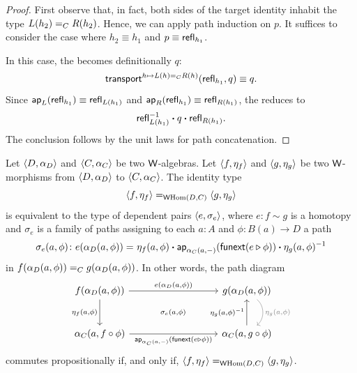 \begin{proof}
    First observe that, in fact, both sides of the target identity inhabit the type $L(h_2)\mathrel{=_{C}}R(h_2)$. Hence, we can apply path induction on $p$. It suffices to consider the case where $h_2\equiv h_1$ and $p\equiv\mathsf{refl}_{h_1}$. 
    
    In this case, the \lhs becomes definitionally $q$:
    \[
        \mathsf{transport}^{h \mapsto L(h) \mathrel{=_{C}} R(h)}(\mathsf{refl}_{h_1}, q) \equiv q.
    \]
    Since $\mathsf{ap}_L(\mathsf{refl}_{h_1})\equiv \mathsf{refl}_{L(h_1)}$ and $\mathsf{ap}_R(\mathsf{refl}_{h_1})\equiv \mathsf{refl}_{R(h_1)}$, the \rhs reduces to
    \[
        \mathsf{refl}_{L(h_1)}^{-1}
            \mathbin{\boldsymbol{\cdot}} q
            \mathbin{\boldsymbol{\cdot}}\mathsf{refl}_{R(h_1)}.
    \]
    The conclusion follows by the unit laws for path concatenation.
\end{proof}

\begin{lem}\label{lem:WHom-equality}
    Let\/ $\langle D,\alpha_D\rangle$ and\/ $\langle C,\alpha_C\rangle$ be two\/ $\mathsf{W}$-algebras. Let\/ $\langle f,\eta_f\rangle$ and\/ $\langle g,\eta_g\rangle$ be two\/ $\mathsf{W}$-morphisms from\/ $\langle D,\alpha_D\rangle$ to\/ $\langle C,\alpha_C\rangle$. The identity type
    \[
        \langle f,\eta_f\rangle\mathrel{=_{\mathsf{W}{\operatorname{Hom}}(D,C)}}\langle g,\eta_g\rangle
    \]
    is equivalent to the type of dependent pairs\/ $\langle e,\sigma_e\rangle$, where\/ $e\colon f\sim g$ is a homotopy and\/ $\sigma_e$ is a family of paths assigning to each\/ $a\colon A$ and\/ $\phi\colon B(a)\to D$ a path
    \[
        \sigma_e(a,\phi)\colon
            e(\alpha_D(a,\phi))
            \eq{}
            \eta_f(a,\phi)
            \ct\fun{ap}_{\alpha_C(a,\dummy)}(
                \fun{funext}(e\rwct\phi))
            \ct\eta_g(a,\phi)^{-1}
    \]
    in\/ $f(\alpha_D(a,\phi))\mathrel{=_{C}} g(\alpha_D(a,\phi))$. In other words, the path diagram
    \[
        \begin{tikzcd}[row sep=large, column sep=3.2cm]
            f(\alpha_D(a,\phi))
                    \arrow[r,"{e(\alpha_D(a,\phi))}"]
                    \arrow[d,"{\eta_f(a,\phi)}"']
                    \arrow[rd,
                        "{\scriptstyle \sigma_e(a,\phi)}",
                        phantom]
                &g(\alpha_D(a,\phi))
                    \arrow[d,
                        bend left=50,
                        gray,"{\eta_g(a,\phi)}"]\\
            \alpha_C(a,f\circ\phi)
                    \arrow[r,
                        "{\fun{ap}_{\alpha_C(a,\dummy)}
                            (\fun{funext}(e\rwct\phi))
                        }",
                        swap]
                &\alpha_C(a,g\circ\phi)
                    \arrow[u,
                        "{\eta_g(a,\phi)^{-1}}"]
        \end{tikzcd}
    \]
    commutes propositionally if, and only if, $\langle f,\eta_f\rangle\mathrel{=_{\mathsf{W}{\operatorname{Hom}}(D,C)}}\langle g,\eta_g\rangle$.
\end{lem}

